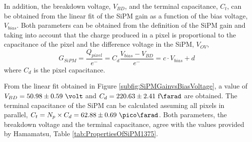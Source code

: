 In addition, the breakdown voltage, $V_{BD}$, and the terminal capacitance, $C_t$, can be obtained from the linear fit of the SiPM gain as a function of the bias voltage, $V_{bias}$. Both parameters can be obtained from the definition of the SiPM gain and taking into account that the charge produced in a pixel is proportional to the capacitance of the pixel and the difference voltage in the SiPM, $V_{OV}$,
\begin{equation}
G_{SiPM}=\frac{Q_{pixel}}{e^-} = C_d \frac{V_{bias}-V_{BD}}{e^-} = c \cdot{} V_{bias}+d
\label{SiPMGain_Capacitance}
\end{equation}
where $C_d$ is the pixel capacitance.

From the linear fit obtained in Figure \ref{subfig:SiPMGainvsBiasVoltage}, a value of $V_{BD}=50.98 \pm 0.59~\volt$ and $C_d{}= 220.63 \pm 2.41~\text{f}\farad$ are obtained. The terminal capacitance of the SiPM can be calculated assuming all pixels in parallel, $C_{t}=N_{p}\times C_{d}=62.88 \pm 0.69~\pico\farad$. Both parameters, the breakdown voltage and the terminal capacitance, agree with the values provided by Hamamatsu, Table \ref{tab:PropertiesOfSiPM1375}. 

